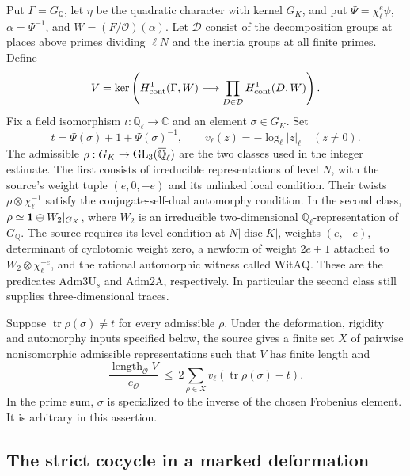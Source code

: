 Put \(\Gamma=G_{\mathbb Q}\), let \(\eta\) be the quadratic character
with kernel \(G_K\), and put \(\Psi=\chi_\ell^e\psi\),
\(\alpha=\Psi^{-1}\), and \(W=(F/\mathcal O)(\alpha)\).
Let \(\mathcal D\) consist of the decomposition groups at places above
primes dividing \(\ell N\) and the inertia groups at all finite primes.
Define
\[
 V=\ker\left(H^1_{\rm cont}(\Gamma,W)\longrightarrow
                      \prod_{D\in\mathcal D}H^1_{\rm cont}(D,W)\right).
\]
Fix a field isomorphism \(\iota:\overline{\mathbb Q}_\ell\to\mathbb C\)
and an element \(\sigma\in G_K\). Set
\[
 t=\Psi(\sigma)+1+\Psi(\sigma)^{-1},\qquad
 v_\ell(z)=-\log_\ell |z|_\ell\quad(z\ne0).
\]
The admissible \(\rho:G_K\to{\rm GL}_3(\overline{\mathbb Q}_\ell)\)
are the two classes used in the integer estimate. The first consists
of irreducible representations of level \(N\), with the source's
weight tuple \((e,0,-e)\) and its unlinked local condition. Their
twists \(\rho\otimes\chi_\ell^{-1}\) satisfy the conjugate-self-dual
automorphy condition. In the second class,
\(\rho\simeq{\bf1}\oplus W_2|_{G_K}\), where \(W_2\) is an irreducible
two-dimensional \(\overline{\mathbb Q}_\ell\)-representation of
\(G_{\mathbb Q}\). The source requires its level condition
at \(N|\operatorname{disc}K|\), weights \((e,-e)\), determinant of
cyclotomic weight zero, a newform of weight \(2e+1\) attached to
\(W_2\otimes\chi_\ell^{-e}\), and the rational automorphic witness
called \(\mathrm{WitAQ}\). These are the predicates
\(\mathrm{Adm3U}_s\) and \(\mathrm{Adm2A}\), respectively. In
particular the second class still supplies three-dimensional traces.

Suppose \(\operatorname{tr}\rho(\sigma)\ne t\) for every admissible
\(\rho\). Under the deformation, rigidity and automorphy inputs specified
below, the source gives a finite set \(X\) of pairwise nonisomorphic
admissible representations such that \(V\) has finite length and
\begin{equation}
 \frac{\operatorname{length}_{\mathcal O}V}{e_\mathcal O}
 \ \le\ 2\sum_{\rho\in X}v_\ell(\operatorname{tr}\rho(\sigma)-t).
 \label{eq:single-def-ineq}
\end{equation}
In the prime sum, \(\sigma\) is specialized to the inverse of the
chosen Frobenius element. It is arbitrary in this assertion.

\subsection{The strict cocycle in a marked deformation}

